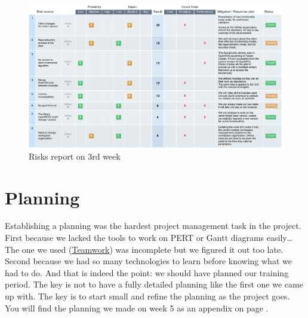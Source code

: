 \begin{figure}[!htbp]
  \centering
  \includegraphics[width=\linewidth]{img/risks.pdf}
  \caption{Risks report on 3rd week}
  \label{fig:risks}
\end{figure}

\section{Planning}

Establishing a planning was the hardest project management task in the
project. First because we lacked the tools to work on PERT or Gantt
diagrams easily\ldots The one we used
(\href{https://www.teamwork.com/}{Teamwork}) was incomplete but we
figured it out too late. Second because we had so many technologies to
learn before knowing what we had to do. And that is indeed the point:
we should have planned our training period. The key is not to have a
fully detailed planning like the first one we came up with. The key is
to start small and refine the planning as the project goes. You will
find the planning we made on week 5 as an appendix on page
\pageref{app:planning}.
